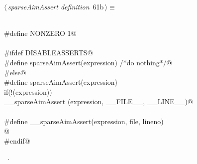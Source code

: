 \documentclass{article}
\begin{document}
\begin{flushleft} \small
\begin{minipage}{\linewidth}\label{scrap91}\raggedright\small
{} $\langle\,${\itshape sparseAimAssert definition}\nobreak\ {\footnotesize {61b}}$\,\rangle\equiv$
\vspace{-1ex}
\begin{list}{}{} \item
\mbox{}\verb@@\\
\mbox{}\verb@#define NONZERO 1@\\
\mbox{}\verb@@\\
\mbox{}\verb@#ifdef DISABLEASSERTS@\\
\mbox{}\verb@#define sparseAimAssert(expression) /*do nothing*/@\\
\mbox{}\verb@#else@\\
\mbox{}\verb@#define sparseAimAssert(expression)  \@\\
\mbox{}\verb@  if(!(expression))\@\\
\mbox{}\verb@                   __sparseAimAssert (expression, __FILE__, __LINE__)@\\
\mbox{}\verb@@\\
\mbox{}\verb@#define __sparseAimAssert(expression, file, lineno)  \@\\
\mbox{}@\\
\mbox{}\verb@#endif@\\
\mbox{}\verb@@{\NWsep}
\end{list}
\vspace{-1.5ex}
\footnotesize
\begin{list}{}{\setlength{\itemsep}{-\parsep}\setlength{\itemindent}{-\leftmargin}}
\item \NWtxtMacroRefIn\ .

\item{}
\end{list}
\end{minipage}\vspace{4ex}
\end{flushleft}
\end{document}

